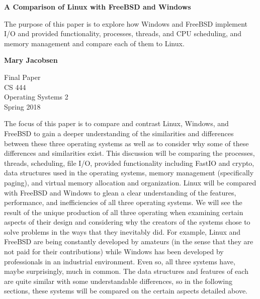 \documentclass[letterpaper,10pt,onecolumn,draftclsnofoot,]{article}
\begin{document}
\begin{titlepage}
    \begin{center}
        \vspace*{1cm}
        
        \textbf{A Comparison of Linux with FreeBSD and Windows}
        
        \vspace{0.5cm}
        The purpose of this paper is to explore how Windows and FreeBSD implement I/O and provided functionality, processes, threads, and CPU scheduling, and memory management and compare each of them to Linux.
        
        \vspace{1.5cm}
        
        \textbf{Mary Jacobsen}
        
        Final Paper\\
        CS 444\\
        Operating Systems 2\\
        Spring 2018
        
    \end{center}
\end{titlepage}
The focus of this paper is to compare and contrast Linux, Windows, and FreeBSD to gain a deeper understanding of the similarities and differences between these three operating systems as well as to consider why some of these differences and similarities exist.
This discussion will be comparing the processes, threads, scheduling, file I/O, provided functionality including FastIO and crypto, data structures used in the operating systems, memory management (specifically paging), and virtual memory allocation and organization. Linux will be compared with FreeBSD and Windows to glean a clear understanding of the features, performance, and inefficiencies of all three operating systems. We will see the result of the unique production of all three operating when examining certain aspects of their design and considering why the creators of the systems chose to solve problems in the ways that they inevitably did. For example, Linux and FreeBSD are being constantly developed by amateurs (in the sense that they are not paid for their contributions) while Windows has been developed by professionals in an industrial environment. Even so, all three systems have, maybe surprisingly, much in common. The data structures and features of each are quite similar with some understandable differences, so in the following sections, these systems will be compared on the certain aspects detailed above.
\end{document}
